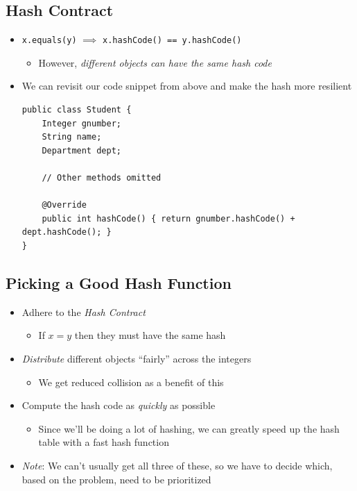 \documentclass[10pt]{article}
\begin{document}
\subsection*{Hash Contract}
\begin{itemize}
    \item \texttt{x.equals(y)} $\implies$ \texttt{x.hashCode() == y.hashCode()}
    \begin{itemize}
        \item However, \textit{different objects can have the same hash code}
    \end{itemize}
    \item We can revisit our code snippet from above and make the hash more resilient
    \begin{verbatim}
public class Student {
    Integer gnumber;
    String name;
    Department dept;

    // Other methods omitted

    @Override
    public int hashCode() { return gnumber.hashCode() + dept.hashCode(); }
}
        \end{verbatim}
\end{itemize}

\subsection*{Picking a Good Hash Function}
\begin{itemize}
    \item Adhere to the \textit{Hash Contract}
    \begin{itemize}
        \item If $x = y$ then they must have the same hash
    \end{itemize}
    \item \textit{Distribute} different objects ``fairly'' across the integers
    \begin{itemize}
        \item We get reduced collision as a benefit of this
    \end{itemize}
    \item Compute the hash code as \textit{quickly} as possible
    \begin{itemize}
        \item Since we'll be doing a lot of hashing, we can greatly speed up the hash table with a fast hash function
    \end{itemize}
    \item \textit{Note}: We can't usually get all three of these, so we have to decide which, based on the problem, need to be prioritized 
\end{itemize}
\end{document}
